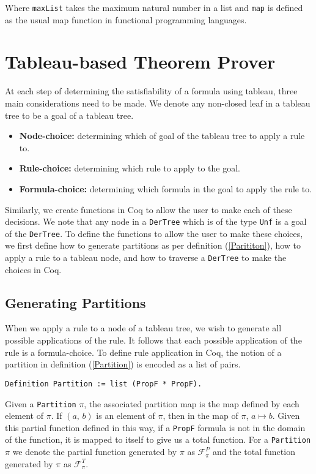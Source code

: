 \documentclass{llncs}
\begin{document}
Where \verb+maxList+ takes the maximum natural number in a list and \verb+map+
is defined as the usual map function in functional programming languages.

\section{Tableau-based Theorem Prover}

At each step of determining the satisfiability of a formula using tableau,
three main considerations need to be made. We denote any non-closed leaf in a
tableau tree to be a goal of a tableau tree.

\begin{itemize}
\item \textbf{Node-choice:} determining which of goal of the tableau tree to
apply a rule to.
\item \textbf{Rule-choice:} determining which rule to apply to the goal.
\item \textbf{Formula-choice:} determining which formula in the goal to apply
the rule to.
\end{itemize}

Similarly, we create functions in Coq to allow the user to make each of these
decisions. We note that any node in a \verb+DerTree+ which is of the type
\verb+Unf+ is a goal of the \verb+DerTree+. To define the functions to allow
the user to make these choices, we first define how to generate partitions
as per definition (\ref{Parititon}), how to apply a rule to a tableau
node, and how to traverse a \verb+DerTree+ to make the choices in Coq.

\subsection{Generating Partitions}

When we apply a rule to a node of a tableau tree, we wish to generate all
possible applications of the rule. It follows that each possible application of
the rule is a formula-choice. To define rule application in Coq, the notion of
a partition in definition (\ref{Partition}) is encoded as a list of pairs.

\begin{verbatim}
Definition Partition := list (PropF * PropF).
\end{verbatim}

Given a \verb+Partition+ $\pi$, the associated partition map is the map defined
by each element of $\pi$. If $(a, \, b)$ is an element of $\pi$, then in the
map of $\pi$, $a \mapsto b$. Given this partial function defined in this way,
if a \verb+PropF+ formula is not in the domain of the function, it is mapped to
itself to give us a total function. For a \verb+Partition+ $\pi$ we denote the 
partial function generated by $\pi$ as $\mathcal{F}^{P}_{\pi}$ and the total
function generated by $\pi$ as $\mathcal{F}^{T}_{\pi}$.
\end{document}
